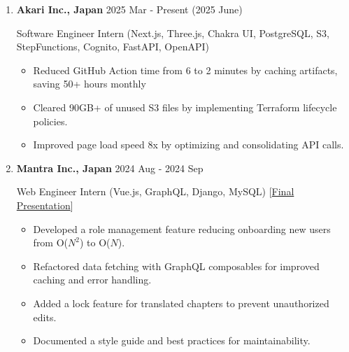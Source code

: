 \documentclass[
  a4paper,
  10pt,
  dvipdfmx
]{article}
\begin{document}
\begin{enumerate}[]
  \item \textbf{Akari Inc., Japan}  \hfill 2025 Mar - Present (2025 June)

        Software Engineer Intern (Next.js, Three.js, Chakra UI, PostgreSQL, S3, StepFunctions, Cognito, FastAPI, OpenAPI)

        \begin{itemize}
          \item Reduced GitHub Action time from 6 to 2 minutes by caching artifacts, saving 50+ hours monthly
          \item Cleared 90GB+ of unused S3 files by implementing Terraform lifecycle policies.
          \item Improved page load speed 8x by optimizing and consolidating API calls.
        \end{itemize}

  \item \textbf{Mantra Inc., Japan} \hfill 2024 Aug - 2024 Sep

        Web Engineer Intern (Vue.js, GraphQL, Django, MySQL) [\href{https://mantra-present.vercel.app/1}{Final Presentation}]

        \begin{itemize}
          \item Developed a role management feature reducing onboarding new users from O($N^2$) to O($N$).
          \item Refactored data fetching with GraphQL composables for improved caching and error handling.
          \item Added a lock feature for translated chapters to prevent unauthorized edits.
          \item Documented a style guide and best practices for maintainability.
        \end{itemize}





\end{enumerate}
\end{document}
